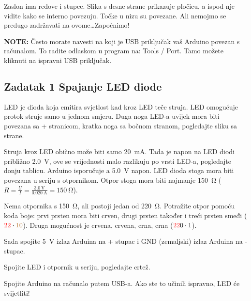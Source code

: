 \documentclass{arduino}
\begin{document}
Zaslon ima redove i stupce. Slika s desne strane prikazuje pločicu, a ispod nje vidite kako se interno povezuju. Točke u nizu su povezane. Ali nemojmo se predugo zadržavati na ovome\dots Započnimo!

\textbf{NOTE:} Često morate navesti na koji je USB priključak vaš Arduino povezan s računalom. To radite odlaskom u program na: Tools / Port. Tamo možete kliknuti na ispravni USB priključak.

\newpage

\subsection{Zadatak 1 Spajanje LED diode}

LED je dioda koja emitira svjetlost kad kroz LED teče struja. LED omogućuje protok struje samo u jednom smjeru. Duga noga LED-a uvijek mora biti povezana sa + stranicom, kratka noga sa bočnom stranom, pogledajte sliku sa strane.

Struja kroz LED obično može biti samo \SI{20}{\milli\ampere}. Tada je napon na LED diodi približno \SI{2.0}{\volt}, ove se vrijednosti malo razlikuju po vrsti LED-a, pogledajte donju tablicu. Arduino isporučuje a \SI{5.0}{\volt} napon. LED dioda stoga mora biti povezana u seriju s otpornikom. Otpor stoga mora biti najmanje \SI{150}{\ohm} ($R = \frac{U}{I} = \frac{\SI{3.0}{\volt}}{\SI{0.020}{\ampere}} = \SI{150}{\ohm}$).


\begin{alphalist}
\item Nema otpornika s \SI{150}{\ohm}, ali postoji jedan od \SI{220}{\ohm}. Potražite otpor pomoću koda boje: prvi prsten mora biti crven, drugi prsten također i treći prsten smeđi ($\textcolor{red}{2}\textcolor{red}{2} \cdot \textcolor{brown}{10}$). Druga mogućnost je crvena, crvena, crna, crna ($\textcolor{red}{2}\textcolor{red}{2}\textcolor{black}{0} \cdot \textcolor{black}{1}$).

\item Sada spojite \SI{5}{\volt} izlaz Arduina na + stupac i GND (zemaljski) izlaz Arduina na - stupac.

\item Spojite LED i otpornik u seriju, pogledajte crtež.

\item Spojite Arduino na računalo putem USB-a. Ako ste to učinili ispravno, LED će svijetliti!
\end{alphalist}
\end{document}
